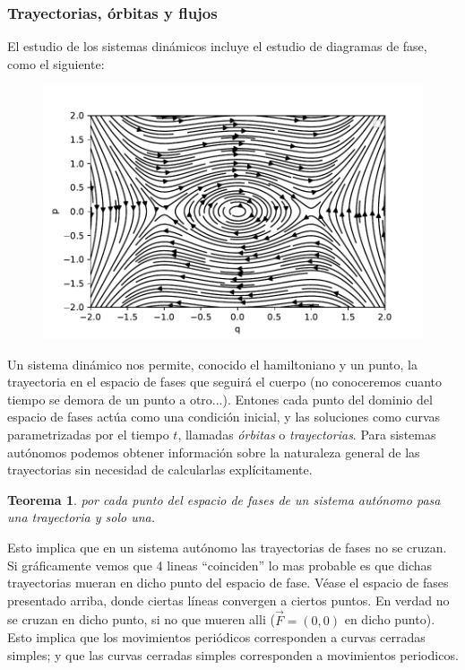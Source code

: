 \documentclass[12pt,a4paper]{article}
\numberwithin{equation}{section}
\numberwithin{figure}{section}
\newtheorem{theorem}{Teorema}[section]
\begin{document}
\subsubsection{Trayectorias, órbitas y flujos}

El estudio de los sistemas dinámicos incluye el estudio de diagramas de fase, como el siguiente:

\begin{figure}[h!] \centering
\includegraphics[scale=1]{Ejercicio-23a.pdf}
\end{figure}

Un sistema dinámico nos permite, conocido el hamiltoniano y un punto, la trayectoria en el espacio de fases que seguirá el cuerpo (no conoceremos  cuanto tiempo se demora de un punto a otro...). Entones cada punto del dominio del espacio de fases actúa como una condición inicial, y las soluciones como curvas parametrizadas por el tiempo $t$, llamadas \textit{órbitas} o \textit{trayectorias}. Para sistemas autónomos podemos obtener información sobre la naturaleza general de las trayectorias sin necesidad de calcularlas explícitamente. 

\begin{theorem}
por cada punto del espacio de fases de un sistema autónomo pasa una trayectoria y solo una.
\end{theorem}

Esto implica que en un sistema autónomo las trayectorias de fases no se cruzan. Si gráficamente vemos que 4 lineas ``coinciden'' lo mas probable es que dichas trayectorias mueran en dicho punto del espacio de fase. Véase el espacio de fases presentado arriba, donde ciertas líneas convergen a ciertos puntos. En verdad no se cruzan en dicho punto, si no que mueren alli ($\vec{F} = (0,0)$ en dicho punto). Esto implica que los movimientos periódicos corresponden a curvas cerradas simples; y que las curvas cerradas simples corresponden a movimientos periodicos. \\
\end{document}
